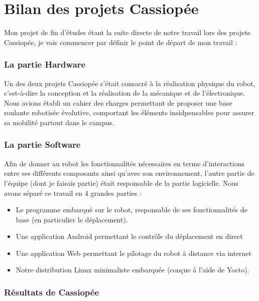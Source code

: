 \documentclass{report}
\begin{document}
    \section{Bilan des projets Cassiopée}

    {Mon projet de fin d'études étant la suite directe de notre travail lors des
     projets Cassiopée, je vais commencer par définir le point de départ de mon travail :}

     \subsubsection{La partie Hardware}

     {Un des deux projets Cassiopée s'était consacré à la réalisation physique
     du robot, c'est-à-dire la conception et la réalisation de la mécanique et
     de l'électronique. Nous avions établi un cahier des charges permettant de
    proposer une base roulante robotisée évolutive, comportant les éléments
    insidpensables pour assurer sa mobilité partout dans le campus.}

    \subsubsection{La partie Software}

    {Afin de donner au robot les fonctionnalités nécessaires en terme d'interactions
    entre ses différents composants ainsi qu'avec son environnement, l'autre partie
    de l'équipe (dont je faisais partie) était responsable de la partie logicielle.
    Nous avons séparé ce travail en 4 grandes parties :}
    \begin{itemize}
      \item Le programme embarqué sur le robot, responsable de ses
      fonctionnalités de base (en particulier le déplacement).
      \item Une application Android permettant le contrôle du déplacement en direct
      \item Une application Web permettant le pilotage du robot à distance via internet
      \item Notre distribution Linux minimaliste embarquée (conçue à l'aide de Yocto).
      \newline
    \end{itemize}

    \subsubsection{Résultats de Cassiopée}
\end{document}
